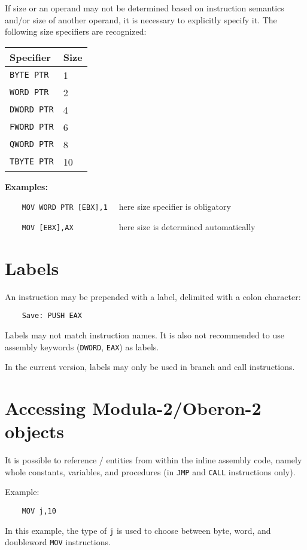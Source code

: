 If size or an operand may not be determined based on instruction semantics
and/or size of another operand, it is necessary to explicitly specify it.
The following size specifiers are recognized:

\begin{center}
\begin{tabular}{ll}
\bf Specifier    & \bf Size \\
\hline
\verb'BYTE PTR'  & 1   \\
\verb'WORD PTR'  & 2   \\
\verb'DWORD PTR' & 4   \\
\verb'FWORD PTR' & 6   \\
\verb'QWORD PTR' & 8   \\
\verb'TBYTE PTR' & 10
\end{tabular}
\end{center}

{\bf Examples:}

\verb'    MOV WORD PTR [EBX],1  ' here size specifier is obligatory

\verb'    MOV [EBX],AX          ' here size is determined automatically

\section{Labels}

An instruction may be prepended with a label, delimited with a colon character:

\verb'    Save: PUSH EAX'

Labels may not match instruction names. It is also not recommended to use
assembly keywords (\verb'DWORD', \verb'EAX') as labels.

In the current version, labels may only be used in branch and call
instructions.

\section{Accessing Modula-2/Oberon-2 objects}
\label{asm:hll}

It is possible to reference \mt{}/\ot{} entities from within
the inline assembly code, namely whole constants, variables,
and procedures (in \verb'JMP' and \verb'CALL' instructions only).

Example:

\verb'    MOV j,10'

In this example, the type of \verb'j' is used to choose between
byte, word, and doubleword \verb'MOV' instructions.


